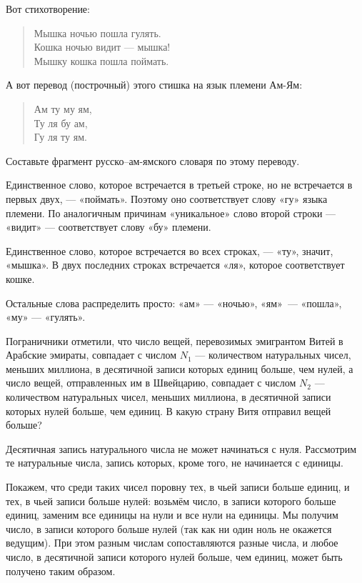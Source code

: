 \begin{itemize}

	\itA Вот стихотворение:

\begin{quote}
Мышка ночью пошла гулять. \\
Кошка ночью видит --- мышка! \\
Мышку кошка пошла поймать.
\end{quote}

А вот перевод (построчный) этого стишка на язык племени Ам-Ям:

\begin{quote}
Ам ту му ям, \\
Ту ля бу ам, \\
Гу ля ту ям.
\end{quote}

Составьте фрагмент русско--ам-ямского словаря по этому переводу.

	\itr Единственное слово, которое встречается в третьей строке, но не встречается в первых двух, — «поймать». Поэтому оно соответствует слову «гу» языка племени. По аналогичным причинам «уникальное» слово второй строки — «видит» — соответствует слову «бу» племени.
	
	Единственное слово, которое встречается во всех строках, — «ту», значит, «мышка». В двух последних строках встречается «ля», которое соответствует кошке.
	
	Остальные слова распределить просто: «ам» — «ночью», «ям»~— «пошла», «му» — «гулять».

	\itC Пограничники отметили, что число вещей, перевозимых эмигрантом  Витей в Арабские эмираты, совпадает с числом $N_1$ --- количеством натуральных чисел, меньших миллиона, в десятичной записи которых единиц больше, чем нулей, а число вещей, отправленных им в Швейцарию, совпадает с числом $N_2$ --- количеством натуральных чисел, меньших миллиона, в десятичной записи которых нулей больше, чем единиц. В какую страну Витя отправил вещей больше?
	
	\itr Десятичная запись натурального числа не может начинаться с нуля. Рассмотрим те натуральные числа, запись которых, кроме того, не начинается с единицы.
	
	Покажем, что среди таких чисел поровну тех, в чьей записи больше единиц, и тех, в чьей записи больше нулей: возьмём число, в записи которого больше единиц, заменим все единицы на нули и все нули на единицы. Мы получим число, в записи которого больше нулей (так как ни один ноль не окажется ведущим). При этом разным числам сопоставляются разные числа, и любое число, в десятичной записи которого нулей больше, чем единиц, может быть получено таким образом.
	

\end{itemize}
